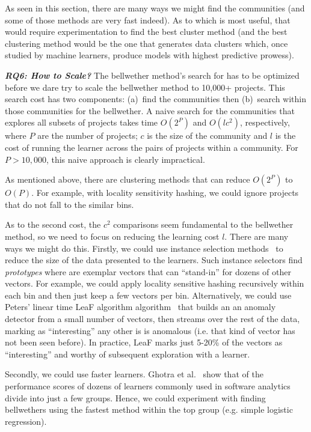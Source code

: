 As seen in this section, 
there are many ways we might find the communities (and some of those methods are very fast indeed). As to which is most useful, that would require experimentation to find the best cluster method (and the best clustering method would be the one that generates data clusters which, once studied by machine learners, produce models with highest predictive prowess).


 

\textit{\textbf{ RQ6: How to Scale?}} The bellwether method's search for  has to be optimized
before we dare try to scale the bellwether method to 10,000+ projects. This search cost has two components: (a)~find the communities then (b)~search within those communities for the bellwether. A naive search for the  communities that explores all subsets of projects
  takes time $O(2^P)$   and   $O(lc^2)$,  respectively, where $P$ are the number of projects; $c$ is the size of the community and $l$ is the cost
  of running the learner across the pairs of projects within a community.
  For $P>10,000$, this naive approach is clearly impractical.

As mentioned above, there are clustering methods that can reduce
 $O(2^P)$  to $O(P)$. For example, with  locality sensitivity hashing, we could ignore projects
 that do  not fall to the similar bins.
 
 As to the second cost, the $c^2$ comparisons seem fundamental to the bellwether method, so we need to focus on reducing the learning cost $l$.
There are many ways we might do this.
Firstly, we could use instance selection methods~\cite{song2017efficient} to reduce the size of the data presented to the learners.
Such instance selectors find {\em prototypes} where are exemplar vectors that can ``stand-in'' for dozens of other 
vectors. For example, we could apply locality sensitive hashing recursively within each bin and  then just keep
a few vectors per bin. Alternatively, we could use Peters' linear time LeaF algorithm algorithm~\cite{peters2015lace2} 
that builds an an anomaly detector from a small number of vectors, then streams over the rest
of the data, marking as ``interesting'' any other is is anomalous (i.e. that kind of vector has not been seen before).
In practice, LeaF marks just  5-20\% of the vectors as ``interesting'' and worthy of subsequent exploration with a learner. 




Secondly, we could use faster learners. Ghotra et al.~\cite{Gh15} 
show that of the performance scores of  dozens of learners commonly used in software analytics divide into just a few groups.
Hence, we could experiment with finding bellwethers using
the fastest method within the top group (e.g. simple logistic regression).

